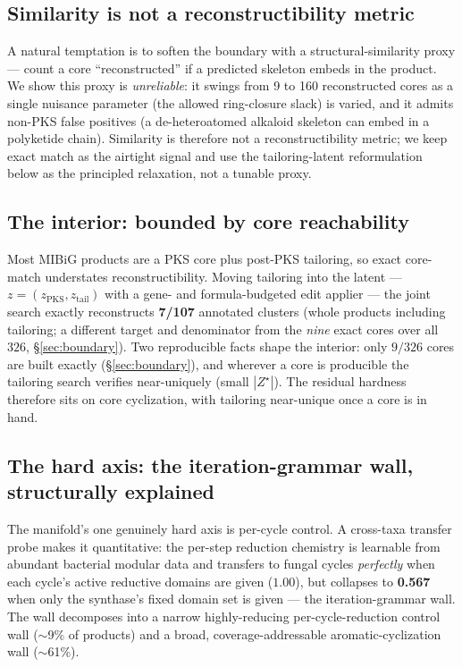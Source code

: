 \subsection{Similarity is not a reconstructibility metric}\label{sec:proxy}
A natural temptation is to soften the boundary with a structural-similarity proxy --- count a core
``reconstructed'' if a predicted skeleton embeds in the product. We show this proxy is \emph{unreliable}:
it swings from 9 to 160 reconstructed cores as a single nuisance parameter (the allowed ring-closure
slack) is varied, and it admits non-PKS false positives (a de-heteroatomed alkaloid skeleton can embed in
a polyketide chain). Similarity is therefore not a reconstructibility metric; we keep exact match as the
airtight signal and use the tailoring-latent reformulation below as the principled relaxation, not a
tunable proxy.

\subsection{The interior: bounded by core reachability}\label{sec:interior}
Most MIBiG products are a PKS core plus post-PKS tailoring, so exact core-match understates
reconstructibility. Moving tailoring into the latent --- $z=(z_{\mathrm{PKS}},z_{\mathrm{tail}})$ with a
gene- and formula-budgeted edit applier --- the joint search exactly reconstructs \textbf{7/107}
annotated clusters (whole products including tailoring; a different target and denominator from the
\emph{nine} exact cores over all $326$, \S\ref{sec:boundary}). Two reproducible facts shape the interior:
only $9/326$ cores are built exactly (\S\ref{sec:boundary}), and wherever a core is producible the
tailoring search verifies near-uniquely (small $|Z^{\star}|$). The residual hardness therefore sits on
core cyclization, with tailoring near-unique once a core is in hand.

\subsection{The hard axis: the iteration-grammar wall, structurally explained}\label{sec:wall}
The manifold's one genuinely hard axis is per-cycle control. A cross-taxa transfer probe makes it
quantitative: the per-step reduction chemistry is learnable from abundant bacterial modular data and
transfers to fungal cycles \emph{perfectly} when each cycle's active reductive domains are given
($1.00$), but collapses to \textbf{0.567} when only the synthase's fixed domain set is given --- the
iteration-grammar wall. The wall decomposes into a narrow highly-reducing per-cycle-reduction control wall
($\sim$9\% of products) and a broad, coverage-addressable aromatic-cyclization wall ($\sim$61\%).

